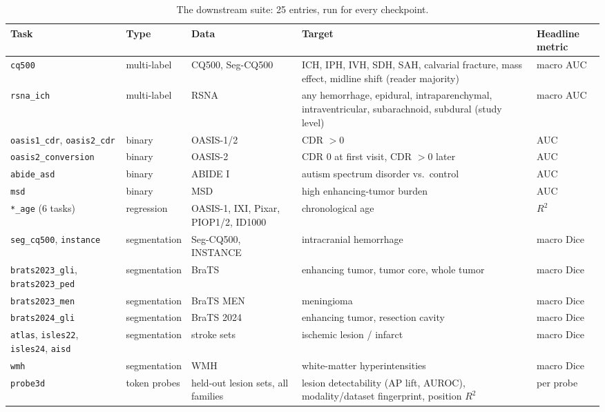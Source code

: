 \documentclass[10pt]{article}
\newcommand{\code}[1]{\texttt{#1}}
\begin{document}
\begin{table}[h]
\centering\footnotesize
\begin{tabularx}{\textwidth}{@{}L{3.0cm} l L{2.6cm} X l@{}}
\toprule
Task & Type & Data & Target & Headline metric \\
\midrule
\code{cq500} & multi-label & CQ500, Seg-CQ500 & ICH, IPH, IVH, SDH, SAH, calvarial fracture, mass effect, midline shift (reader majority) & macro AUC \\
\code{rsna\_ich} & multi-label & RSNA & any hemorrhage, epidural, intraparenchymal, intraventricular, subarachnoid, subdural (study level) & macro AUC \\
\code{oasis1\_cdr}, \code{oasis2\_cdr} & binary & OASIS-1/2 & CDR $>0$ & AUC \\
\code{oasis2\_conversion} & binary & OASIS-2 & CDR 0 at first visit, CDR $>0$ later & AUC \\
\code{abide\_asd} & binary & ABIDE I & autism spectrum disorder vs.\ control & AUC \\
\code{msd} & binary & MSD & high enhancing-tumor burden & AUC \\
\code{*\_age} (6 tasks) & regression & OASIS-1, IXI, Pixar, PIOP1/2, ID1000 & chronological age & $R^2$ \\
\midrule
\code{seg\_cq500}, \code{instance} & segmentation & Seg-CQ500, INSTANCE & intracranial hemorrhage & macro Dice \\
\code{brats2023\_gli}, \code{brats2023\_ped} & segmentation & BraTS & enhancing tumor, tumor core, whole tumor & macro Dice \\
\code{brats2023\_men} & segmentation & BraTS MEN & meningioma & macro Dice \\
\code{brats2024\_gli} & segmentation & BraTS 2024 & enhancing tumor, resection cavity & macro Dice \\
\code{atlas}, \code{isles22}, \code{isles24}, \code{aisd} & segmentation & stroke sets & ischemic lesion / infarct & macro Dice \\
\code{wmh} & segmentation & WMH & white-matter hyperintensities & macro Dice \\
\midrule
\code{probe3d} & token probes & held-out lesion sets, all families & lesion detectability (AP lift, AUROC), modality/dataset fingerprint, position $R^2$ & per probe \\
\bottomrule
\end{tabularx}
\caption{The downstream suite: 25 entries, run for every checkpoint.}
\label{tab:tasks}
\end{table}
\end{document}
